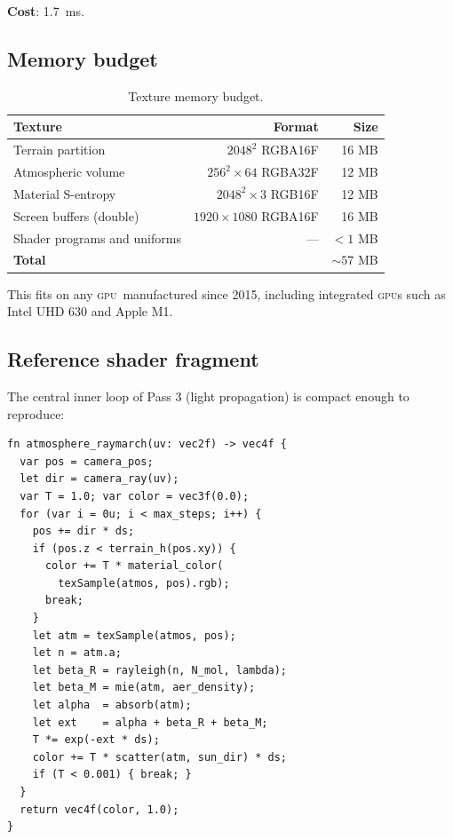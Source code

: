 \documentclass[11pt,twocolumn,a4paper]{article}
\theoremstyle{definition}
\theoremstyle{remark}
\newcommand{\gpu}{\textsc{gpu}}
\newcommand{\wgsl}{\textsc{wgsl}}
\begin{document}
\textbf{Cost}: 1.7~ms.

\subsection{Memory budget}

\begin{table}[H]
\centering\small
\caption{Texture memory budget.}
\begin{tabular}{lrr}
\toprule
\textbf{Texture} & \textbf{Format} & \textbf{Size} \\
\midrule
Terrain partition & $2048^2$ RGBA16F & 16 MB\\
Atmospheric volume & $256^2\times 64$ RGBA32F & 12 MB\\
Material S-entropy & $2048^2\times 3$ RGB16F & 12 MB\\
Screen buffers (double) & $1920\times 1080$ RGBA16F & 16 MB\\
Shader programs and uniforms & --- & $<1$ MB\\
\midrule
\textbf{Total} & & $\sim 57$ MB\\
\bottomrule
\end{tabular}
\end{table}

This fits on any \gpu\ manufactured since 2015, including integrated \gpu s such as Intel UHD 630 and Apple M1.

\subsection{Reference shader fragment}

The central inner loop of Pass 3 (light propagation) is compact enough to reproduce:

\begin{lstlisting}[caption={Pass 3 ray march (abbreviated \wgsl).}]
fn atmosphere_raymarch(uv: vec2f) -> vec4f {
  var pos = camera_pos;
  let dir = camera_ray(uv);
  var T = 1.0; var color = vec3f(0.0);
  for (var i = 0u; i < max_steps; i++) {
    pos += dir * ds;
    if (pos.z < terrain_h(pos.xy)) {
      color += T * material_color(
        texSample(atmos, pos).rgb);
      break;
    }
    let atm = texSample(atmos, pos);
    let n = atm.a;
    let beta_R = rayleigh(n, N_mol, lambda);
    let beta_M = mie(atm, aer_density);
    let alpha  = absorb(atm);
    let ext    = alpha + beta_R + beta_M;
    T *= exp(-ext * ds);
    color += T * scatter(atm, sun_dir) * ds;
    if (T < 0.001) { break; }
  }
  return vec4f(color, 1.0);
}
\end{lstlisting}
\end{document}
